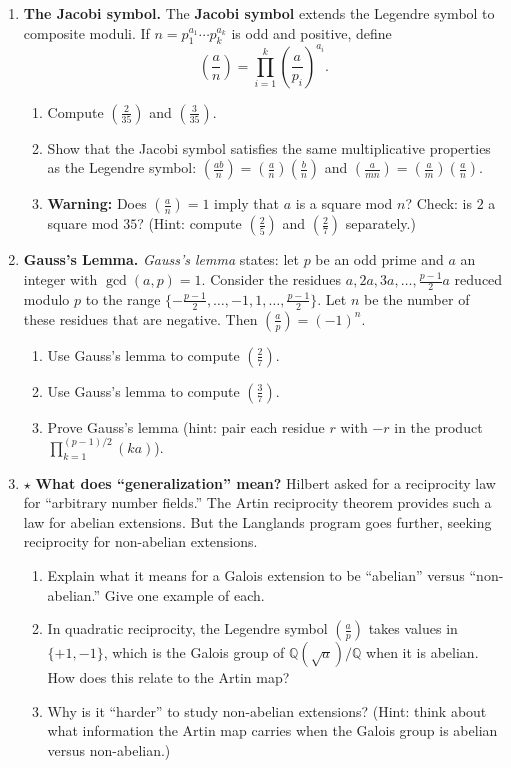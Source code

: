 \begin{enumerate}
    \item \textbf{The Jacobi symbol.} The \textbf{Jacobi symbol} extends the Legendre symbol to composite moduli. If $n = p_1^{a_1} \cdots p_k^{a_k}$ is odd and positive, define
    \[
        \left(\frac{a}{n}\right) = \prod_{i=1}^{k} \left(\frac{a}{p_i}\right)^{a_i}.
    \]
    \begin{enumerate}
        \item Compute $\left(\frac{2}{35}\right)$ and $\left(\frac{3}{35}\right)$.
        \item Show that the Jacobi symbol satisfies the same multiplicative properties as the Legendre symbol: $\left(\frac{ab}{n}\right) = \left(\frac{a}{n}\right)\left(\frac{b}{n}\right)$ and $\left(\frac{a}{mn}\right) = \left(\frac{a}{m}\right)\left(\frac{a}{n}\right)$.
        \item \textbf{Warning:} Does $\left(\frac{a}{n}\right) = 1$ imply that $a$ is a square mod $n$? Check: is $2$ a square mod $35$? (Hint: compute $\left(\frac{2}{5}\right)$ and $\left(\frac{2}{7}\right)$ separately.)
    \end{enumerate}

    \item \textbf{Gauss's Lemma.} \emph{Gauss's lemma} states: let $p$ be an odd prime and $a$ an integer with $\gcd(a,p) = 1$. Consider the residues $a, 2a, 3a, \ldots, \frac{p-1}{2}a$ reduced modulo $p$ to the range $\{-\frac{p-1}{2}, \ldots, -1, 1, \ldots, \frac{p-1}{2}\}$. Let $n$ be the number of these residues that are negative. Then $\left(\frac{a}{p}\right) = (-1)^n$.
    \begin{enumerate}
        \item Use Gauss's lemma to compute $\left(\frac{2}{7}\right)$.
        \item Use Gauss's lemma to compute $\left(\frac{3}{7}\right)$.
        \item Prove Gauss's lemma (hint: pair each residue $r$ with $-r$ in the product $\prod_{k=1}^{(p-1)/2} (ka)$).
    \end{enumerate}

    \item $\star$ \textbf{What does ``generalization'' mean?} Hilbert asked for a reciprocity law for ``arbitrary number fields.'' The Artin reciprocity theorem provides such a law for abelian extensions. But the Langlands program goes further, seeking reciprocity for non-abelian extensions.
    \begin{enumerate}
        \item Explain what it means for a Galois extension to be ``abelian'' versus ``non-abelian.'' Give one example of each.
        \item In quadratic reciprocity, the Legendre symbol $\left(\frac{a}{p}\right)$ takes values in $\{+1, -1\}$, which is the Galois group of $\mathbb{Q}(\sqrt{a})/\mathbb{Q}$ when it is abelian. How does this relate to the Artin map?
        \item Why is it ``harder'' to study non-abelian extensions? (Hint: think about what information the Artin map carries when the Galois group is abelian versus non-abelian.)
    \end{enumerate}


\end{enumerate}
